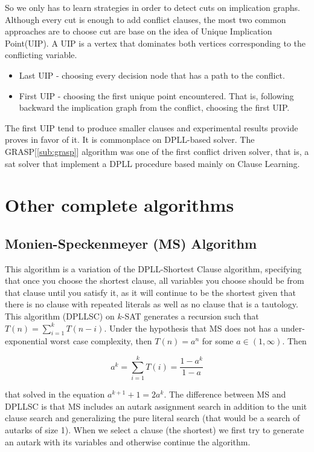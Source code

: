 So we only has to learn strategies in order to detect cuts on implication graphs. Although every cut is enough to add conflict clauses, the most two common approaches are to choose cut are base on the idea of Unique Implication Point(UIP).  A UIP   is   a   vertex    that   dominates   both   vertices   corresponding   to   the   conflicting   variable. 

\begin{itemize}
\item Last UIP - choosing every decision node that has a path to the conflict.
\item First UIP - choosing the first unique point encountered. That is, following backward the implication graph from the conflict, choosing the first UIP.
\end{itemize}


The first UIP tend to produce smaller clauses and experimental results \cite{tichy2006clause} \cite{zhang2001efficient} provide proves in favor of it. It is commonplace on DPLL-based solver. The GRASP[\ref{sub:grasp}] algorithm was one of the first conflict driven solver, that is, a sat solver that implement a DPLL procedure based mainly on Clause Learning. 

\section{Other complete algorithms}

\subsection{Monien-Speckenmeyer (MS) Algorithm}
\label{alg:MS}
This algorithm is a variation of the DPLL-Shortest Clause algorithm, specifying that once you choose the shortest clause, all variables you choose should be from that clause until you satisfy it, as it will continue to be the shortest given that there is no clause with repeated literals as well as no clause that is a tautology. This algorithm (DPLLSC) on $k$-SAT generates a recursion such that $T(n) = \sum_{i=1}^kT(n-i)$. Under the hypothesis that MS does not has a under-exponential worst case complexity, then $T(n) = a^n$ for some $a \in (1,\infty)$.  Then

$$a^k = \sum_{i=1}^kT(i) = \frac{1-a^k}{1-a}$$

that solved in the equation $a^{k+1}+1 = 2a^k$. The difference between MS and DPLLSC is that MS includes an autark assignment search in addition to the unit clause search and generalizing the pure literal search (that would be a search of autarks of size 1). When we select a clause (the shortest) we first try to generate an autark with its variables and otherwise continue the algorithm.


